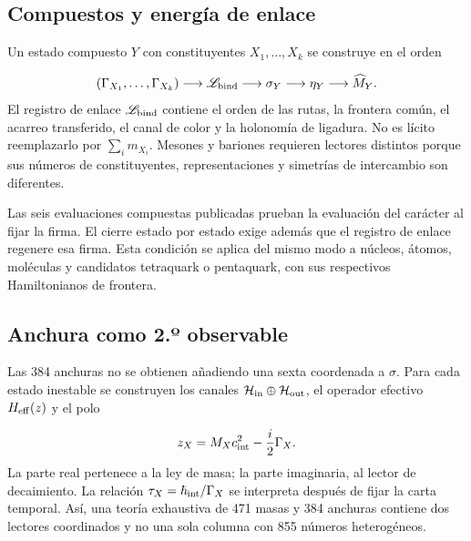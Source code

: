 \subsection{Compuestos y energía de enlace}
Un estado compuesto \(Y\) con constituyentes \(X_1,\ldots,X_k\) se construye en el orden

\[
(\Gamma_{X_1},\ldots,\Gamma_{X_k})
\longrightarrow
\mathscr L_{\rm bind}
\longrightarrow
\sigma_Y
\longrightarrow
\eta_Y
\longrightarrow
\widehat M_Y.
\]
El registro de enlace \(\mathscr L_{\rm bind}\) contiene el orden de las rutas, la frontera común, el acarreo transferido, el canal de color y la holonomía de ligadura. No es lícito reemplazarlo por \(\sum_i m_{X_i}\). Mesones y bariones requieren lectores distintos porque sus números de constituyentes, representaciones y simetrías de intercambio son diferentes.

Las seis evaluaciones compuestas publicadas prueban la evaluación del carácter al fijar la firma. El cierre estado por estado exige además que el registro de enlace regenere esa firma. Esta condición se aplica del mismo modo a núcleos, átomos, moléculas y candidatos tetraquark o pentaquark, con sus respectivos Hamiltonianos de frontera.

\subsection{Anchura como 2.º observable}
Las 384 anchuras no se obtienen añadiendo una sexta coordenada a \(\sigma\). Para cada estado inestable se construyen los canales \(\mathcal H_{\rm in}\oplus\mathcal H_{\rm out}\), el operador efectivo \(H_{\rm eff}(z)\) y el polo

\[
z_X=M_Xc_{\rm int}^{2}-\frac{i}{2}\Gamma_X.
\]
La parte real pertenece a la ley de masa; la parte imaginaria, al lector de decaimiento. La relación \(\tau_X=\hbar_{\rm int}/\Gamma_X\) se interpreta después de fijar la carta temporal. Así, una teoría exhaustiva de 471 masas y 384 anchuras contiene dos lectores coordinados y no una sola columna con 855 números heterogéneos.

